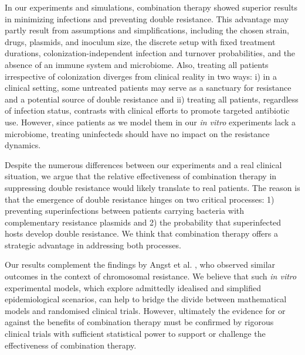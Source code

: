 \documentclass[9pt,twocolumn,twoside,lineno]{pnas-new}
\begin{document}
    In our experiments and simulations, combination therapy showed superior results in minimizing infections and preventing double resistance. 
    This advantage may partly result from assumptions and simplifications, including the chosen strain, drugs, plasmids, and inoculum size, the discrete setup with fixed treatment durations, colonization-independent infection and turnover probabilities, and the absence of an immune system and microbiome. 
    Also, treating all patients irrespective of colonization diverges from clinical reality in two ways: 
    i) in a clinical setting, some untreated patients may serve as a sanctuary for resistance and a potential source of double resistance and 
    ii) treating all patients, regardless of infection status, contrasts with clinical efforts to promote targeted antibiotic use. 
    However, since patients as we model them in our \textit{in vitro} experiments lack a microbiome, treating uninfecteds should have no impact on the resistance dynamics.
    
    Despite the numerous differences between our experiments and a real clinical situation, we argue that the relative effectiveness of combination therapy in suppressing double resistance would likely translate to real patients.
    The reason is that the emergence of double resistance hinges on two critical processes: 1) preventing superinfections between patients carrying bacteria with complementary resistance plasmids and 2) the probability that superinfected hosts develop double resistance.
    We think that combination therapy offers a strategic advantage in addressing both processes.
    
    Our results complement the findings by Angst et al. \cite{Angst2021}, who observed similar outcomes in the context of chromosomal resistance. We believe that such \textit{in vitro} experimental models, which explore admittedly idealised and simplified epidemiological scenarios, can help to bridge the divide between mathematical models and randomised clinical trials. However, ultimately the evidence for or against the benefits of combination therapy must be confirmed by rigorous clinical trials with sufficient statistical power to support or challenge the effectiveness of combination therapy.
    
    
    
   
   \showmatmethods{} %

    \showacknow{} %
    
    \bibsplit[9]
    
\end{document}
